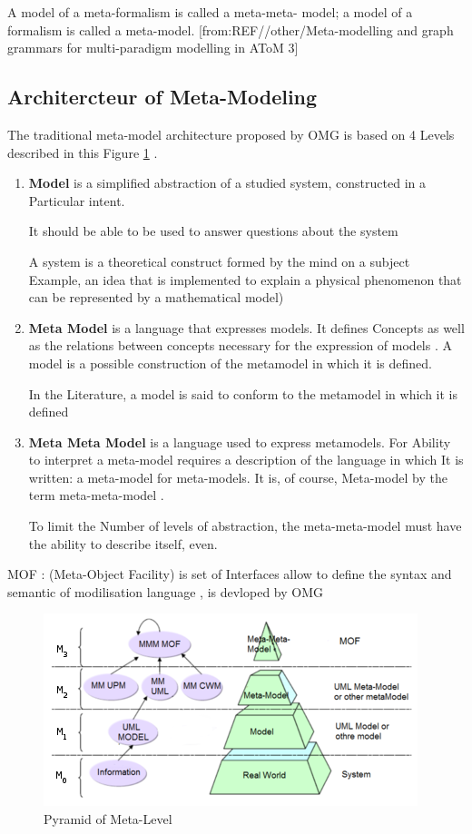 A model of a meta-formalism is called a meta-meta-
model; a model of a formalism is called a meta-model.
[from:REF//other/Meta-modelling and graph grammars for multi-paradigm modelling in AToM 3]

\subsection{Architercteur of Meta-Modeling}
The traditional meta-model architecture proposed by OMG is based on 4 Levels
described in this Figure \ref{fig:Pyramid of Meta-Level} .

\begin{enumerate}
\item \textbf{Model} is a simplified abstraction of a studied system, constructed in a
Particular intent. 

It should be able to be used to answer questions about the system

A system is a theoretical construct formed by the mind on a subject
Example, an idea that is implemented to explain a physical phenomenon that can
be represented by a mathematical model) 

\item \textbf{Meta Model} is a language that expresses models. It defines
Concepts as well as the relations between concepts necessary for the expression of models . 
A model is a possible construction of the metamodel in which it is defined.

In the Literature, a model is said to conform to the metamodel in which it is defined

\item \textbf{Meta Meta Model} is a language used to express metamodels. 
For Ability to interpret a meta-model requires a description of the language in which
It is written: a meta-model for meta-models. 
It is, of course, Meta-model by the term meta-meta-model  . 

To limit the  Number of levels of abstraction, the meta-meta-model 
must have the ability to describe itself, even. 
 

\end{enumerate}

MOF : (Meta-Object Facility) is set of Interfaces allow to define 
the syntax and semantic of modilisation language , is devloped by OMG

\begin{figure}[th]
	\centering
		\includegraphics{Chapiter3/img/Pyramid}
	\caption{\label{fig:Pyramid of Meta-Level}Pyramid of Meta-Level}
\end{figure} 




